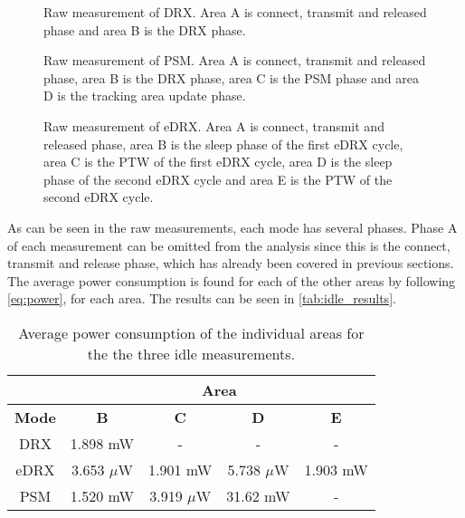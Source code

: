 \begin{minipage}{0.48\textwidth}
\begin{figure}[H]
\centering
\resizebox{\textwidth}{!}{
}
\caption{Raw measurement of \gls{DRX}. Area A is connect, transmit and released phase and area B is the DRX phase.}
\label{fig:DRX}
\end{figure}
\vspace{0.8em}
\end{minipage}%
\hfill
\begin{minipage}{0.48\textwidth}
\begin{figure}[H]
\centering
\resizebox{\textwidth}{!}{
}
\caption{Raw measurement of \gls{PSM}. Area A is connect, transmit and released phase, area B is the DRX phase, area C is the PSM phase and area D is the tracking area update phase.}
\label{fig:PSM}
\end{figure}
\end{minipage}
\vspace{1em}
\begin{figure}[H]
\centering
\begin{minipage}{0.48\textwidth}
\resizebox{\textwidth}{!}{
}
\caption{Raw measurement of \gls{eDRX}. Area A is connect, transmit and released phase, area B is the sleep phase of the first eDRX cycle, area C is the \gls{PTW} of the first eDRX cycle, area D is the sleep phase of the second eDRX cycle and area E is the \gls{PTW} of the second eDRX cycle.}
\label{fig:eDRX1}
\end{minipage}
\end{figure}

As can be seen in the raw measurements, each mode has several phases. Phase A of each measurement can be omitted from the analysis since this is the connect, transmit and release phase, which has already been covered in previous sections. The average power consumption is found for each of the other areas by following \autoref{eq:power}, for each area. The results can be seen in \autoref{tab:idle_results}.

\begin{table}[H]
\centering
\begin{tabular}{|c|c|c|c|c|} 
\multicolumn{1}{c}{ }    & \multicolumn{4}{c}{Area} \\ \hline
\textbf{Mode}    & \textbf{B}    & \textbf{C}     & \textbf{D}     & \textbf{E} \\ \hline
DRX                & 1.898 mW        & -             & -             & - \\ \hline
eDRX            & 3.653 $\mu$W    & 1.901 mW        & 5.738 $\mu$W    & 1.903 mW \\ \hline
PSM             & 1.520 mW        & 3.919 $\mu$W    & 31.62 mW        & - \\ \hline 
\end{tabular}
\caption{Average power consumption of the individual areas for the the three idle measurements.}
\label{tab:idle_results}
\end{table}

